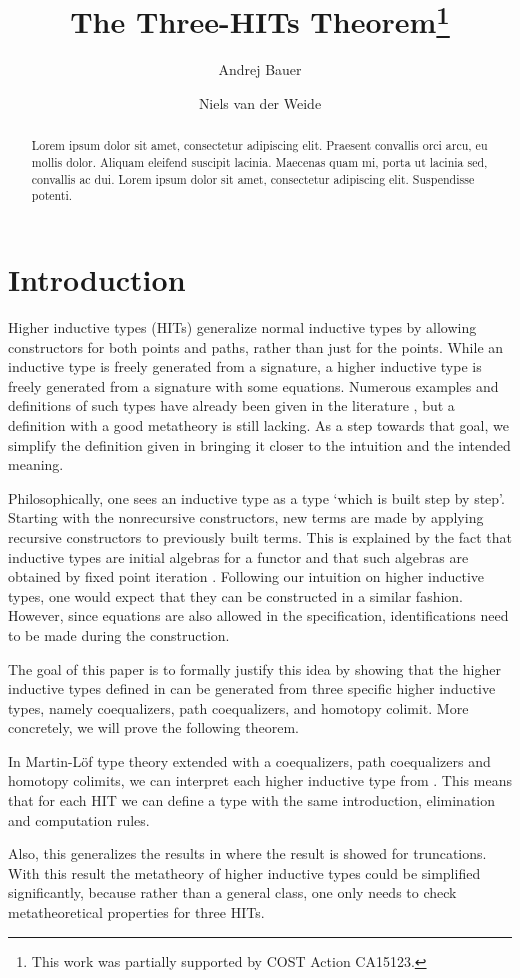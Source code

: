 \documentclass[a4paper,UKenglish]{lipics-v2016}
\title{The Three-HITs Theorem\footnote{This work was partially supported by COST Action CA15123.}}
\author[1]{Andrej Bauer}
\author[2]{Niels van der Weide}
\affil[1]{Faculty of Mathematics and Physics, University of Ljubljana, Ljubljana, Slovenia\\
  \texttt{Andrej.Bauer@andrej.com}}
\affil[2]{Department of Computer Science, Radboud University, Nijmegen, The Netherlands\\
  \texttt{nweide@cs.ru.nl}}
\begin{document}
\maketitle

\begin{abstract}
Lorem ipsum dolor sit amet, consectetur adipiscing elit. Praesent convallis orci arcu, eu mollis dolor. Aliquam eleifend suscipit lacinia. Maecenas quam mi, porta ut lacinia sed, convallis ac dui. Lorem ipsum dolor sit amet, consectetur adipiscing elit. Suspendisse potenti. 
 \end{abstract}

\section{Introduction}
Higher inductive types (HITs) generalize normal inductive types by allowing constructors for both points and paths, rather than just for the points.
While an inductive type is freely generated from a signature, a higher inductive type is freely generated from a signature with some equations.
Numerous examples and definitions of such types have already been given in the literature \cite{altenkirch2016quotient,awodey2012inductive,basoldhigher,sojakova2015higher,hottbook}, but a definition with a good metatheory is still lacking.
As a step towards that goal, we simplify the definition given in \cite{basoldhigher} bringing it closer to the intuition and the intended meaning.

Philosophically, one sees an inductive type as a type `which is built step by step'.
Starting with the nonrecursive constructors, new terms are made by applying recursive constructors to previously built terms.
This is explained by the fact that inductive types are initial algebras for a functor \cite{dybjer1994inductive,dybjer2003induction} and that such algebras are obtained by fixed point iteration \cite{adamek1974free}.
Following our intuition on higher inductive types, one would expect that they can be constructed in a similar fashion.
However, since equations are also allowed in the specification, identifications need to be made during the construction.

The goal of this paper is to formally justify this idea by showing that the higher inductive types defined in \cite{basoldhigher} can be generated from three specific higher inductive types, namely coequalizers, path coequalizers, and homotopy colimit.
More concretely, we will prove the following theorem.
\begin{theorem}
\label{thm:three-hit}
In Martin-L\"of type theory extended with a coequalizers, path coequalizers and homotopy colimits, we can interpret each higher inductive type from \cite{basoldhigher}. 
This means that for each HIT we can define a type with the same introduction, elimination and computation rules.
\end{theorem}
Also, this generalizes the results in \cite{doorn2016constructing,kraus2014general,kraus2016constructions} where the result is showed for truncations.
With this result the metatheory of higher inductive types could be simplified significantly, because rather than a general class, one only needs to check metatheoretical properties for three HITs.
\end{document}
